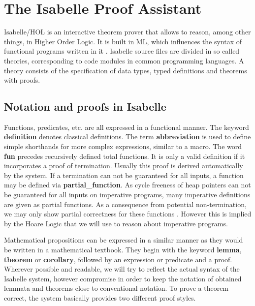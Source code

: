 

\section{The Isabelle Proof Assistant}

Isabelle/HOL is an interactive theorem prover that allows
to reason, among other things,
in Higher Order Logic.
It is built in ML, which influences the syntax of functional
programs written in it \parencite{DBLP:books/sp/NipkowPW02}.
Isabelle source files are divided in so called theories,
corresponding to code modules in common programming languages.
A theory consists of the specification of data types,
typed definitions and theorems with proofs.

\subsection{Notation and proofs in Isabelle}

Functions, predicates, etc. are all expressed in
a functional manner.
The keyword \textbf{definition} denotes classical definitions.
The term \textbf{abbreviation} is used to define simple shorthands for more complex expressions,
similar to a macro.
The word \textbf{fun} precedes recursively defined total functions.
It is only a valid definition if it incorporates a proof of termination.
Usually this proof is derived automatically by the system.
If a termination can not be guaranteed for all inputs,
a function may be defined via \textbf{partial\_function}.
As cycle freeness of heap pointers can not be guaranteed for all inputs
on imperative programs, many imperative definitions are given
as partial functions.
As a consequence from potential non-termination,
we may only show partial correctness for these functions \parencite{DBLP:conf/itp/Krauss10}.
However this is implied by the Hoare Logic that we will use to reason about imperative programs.

Mathematical propositions can be expressed in a similar manner
as they would be written in a mathematical textbook.
They begin with the keyword \textbf{lemma}, \textbf{theorem} or \textbf{corollary},
followed by an expression or predicate and a proof.
Wherever possible and readable, we will try to reflect the actual
syntax of the Isabelle system, however compromise in order to
keep the notation of obtained lemmata and theorems
close to conventional notation.
To prove a theorem correct, the system basically provides two different
proof styles.

